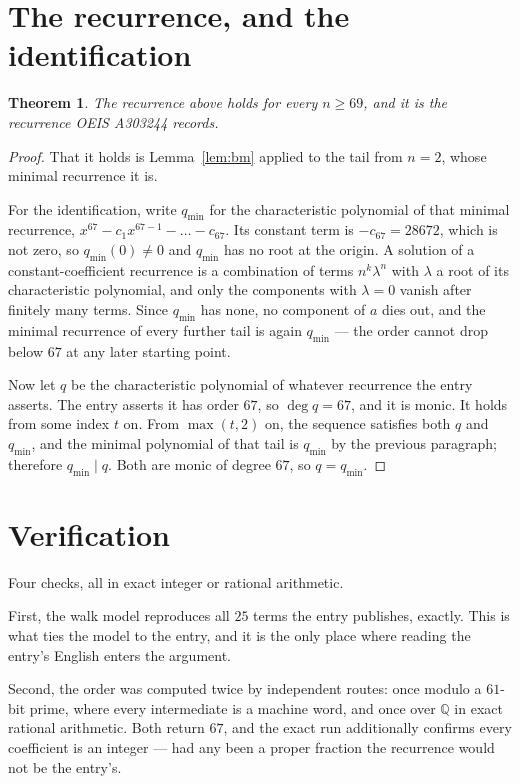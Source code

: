 \documentclass[11pt,a4paper]{article}
\theoremstyle{plain}
\newtheorem{theorem}{Theorem}
\theoremstyle{definition}
\begin{document}
\section{The recurrence, and the identification}

\begin{theorem}
The recurrence above holds for every $n\ge69$, and it is the recurrence OEIS A303244 records.
\end{theorem}

\begin{proof}
That it holds is Lemma~\ref{lem:bm} applied to the tail from $n=2$, whose minimal
recurrence it is.

For the identification, write $q_{\min}$ for the characteristic polynomial of that minimal
recurrence, $x^{67}-c_1x^{67-1}-\dots-c_{67}$. Its constant term is
$-c_{67}=28672$, which is not zero, so $q_{\min}(0)\neq0$ and $q_{\min}$ has no
root at the origin. A solution of a constant-coefficient recurrence is a combination of terms
$n^{k}\lambda^{n}$ with $\lambda$ a root of its characteristic polynomial, and only the
components with $\lambda=0$ vanish after finitely many terms. Since $q_{\min}$ has none, no
component of $a$ dies out, and the minimal recurrence of every further tail is again
$q_{\min}$ --- the order cannot drop below $67$ at any later starting point.

Now let $q$ be the characteristic polynomial of whatever recurrence the entry asserts. The
entry asserts it has order $67$, so $\deg q=67$, and it is monic. It holds from some
index $t$ on. From $\max(t,2)$ on, the sequence satisfies both $q$ and $q_{\min}$, and
the minimal polynomial of that tail is $q_{\min}$ by the previous paragraph; therefore
$q_{\min}\mid q$. Both are monic of degree $67$, so $q=q_{\min}$.
\end{proof}

\section{Verification}

Four checks, all in exact integer or rational arithmetic.

First, the walk model reproduces all $25$ terms the entry publishes, exactly. This is
what ties the model to the entry, and it is the only place where reading the entry's English
enters the argument.

Second, the order was computed twice by independent routes: once modulo a $61$-bit prime, where
every intermediate is a machine word, and once over $\mathbb{Q}$ in exact rational arithmetic.
Both return $67$, and the exact run additionally confirms every coefficient is an integer
--- had any been a proper fraction the recurrence would not be the entry's.
\end{document}
